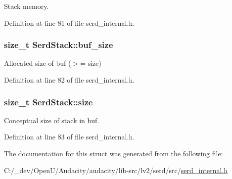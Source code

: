 Stack memory. 



Definition at line 81 of file serd\+\_\+internal.\+h.

\subsubsection[{\texorpdfstring{buf\+\_\+size}{buf_size}}]{\setlength{\rightskip}{0pt plus 5cm}size\+\_\+t Serd\+Stack\+::buf\+\_\+size}\hypertarget{struct_serd_stack_ae60a132820792258504633e72535bf94}{}\label{struct_serd_stack_ae60a132820792258504633e72535bf94}


Allocated size of buf ($>$= size) 



Definition at line 82 of file serd\+\_\+internal.\+h.

\subsubsection[{\texorpdfstring{size}{size}}]{\setlength{\rightskip}{0pt plus 5cm}size\+\_\+t Serd\+Stack\+::size}\hypertarget{struct_serd_stack_a2fda2753d2ada98036894458c573bf38}{}\label{struct_serd_stack_a2fda2753d2ada98036894458c573bf38}


Conceptual size of stack in buf. 



Definition at line 83 of file serd\+\_\+internal.\+h.



The documentation for this struct was generated from the following file\+:\begin{DoxyCompactItemize}
\item 
C\+:/\+\_\+dev/\+Open\+U/\+Audacity/audacity/lib-\/src/lv2/serd/src/\hyperlink{serd__internal_8h}{serd\+\_\+internal.\+h}\end{DoxyCompactItemize}
